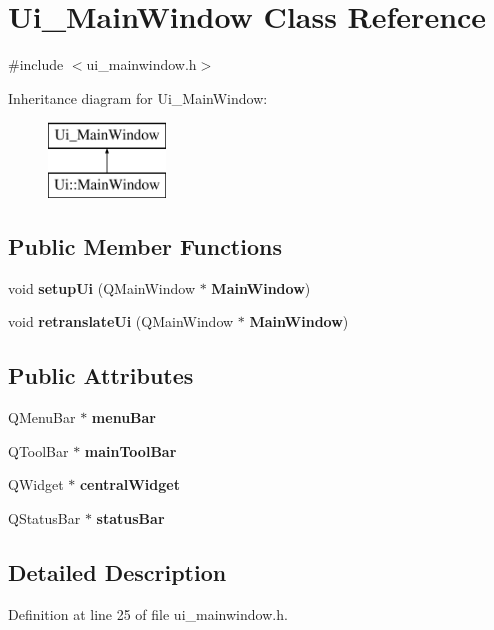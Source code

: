\section{Ui\+\_\+\+Main\+Window Class Reference}
\label{class_ui___main_window}


{\ttfamily \#include $<$ui\+\_\+mainwindow.\+h$>$}

Inheritance diagram for Ui\+\_\+\+Main\+Window\+:\begin{figure}[H]
\begin{center}
\leavevmode
\includegraphics[height=2.000000cm]{df/dd7/class_ui___main_window}
\end{center}
\end{figure}
\subsection*{Public Member Functions}
\begin{DoxyCompactItemize}
\item 
void \textbf{ setup\+Ui} (Q\+Main\+Window $\ast$\textbf{ Main\+Window})
\item 
void \textbf{ retranslate\+Ui} (Q\+Main\+Window $\ast$\textbf{ Main\+Window})
\end{DoxyCompactItemize}
\subsection*{Public Attributes}
\begin{DoxyCompactItemize}
\item 
Q\+Menu\+Bar $\ast$ \textbf{ menu\+Bar}
\item 
Q\+Tool\+Bar $\ast$ \textbf{ main\+Tool\+Bar}
\item 
Q\+Widget $\ast$ \textbf{ central\+Widget}
\item 
Q\+Status\+Bar $\ast$ \textbf{ status\+Bar}
\end{DoxyCompactItemize}


\subsection{Detailed Description}


Definition at line 25 of file ui\+\_\+mainwindow.\+h.



